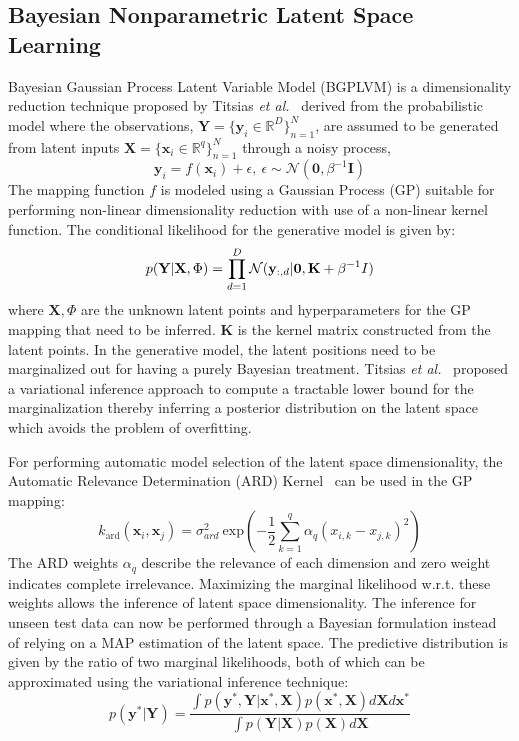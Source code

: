 \documentclass{article}
\begin{document}
\subsection{Bayesian Nonparametric Latent Space Learning}
\label{section:bgplvm}

Bayesian Gaussian Process Latent Variable Model (BGPLVM) is a dimensionality reduction technique proposed by Titsias \emph{et al.}~\cite{bgplvm}  derived from the probabilistic model where the observations, $\mathbf{Y} = \{\mathbf{y}_{i} \in \mathbb{R}^D\}_{n=1}^N$, are assumed to be generated from latent inputs $\mathbf{X} = \{\mathbf{x}_{i} \in \mathbb{R}^q\}_{n=1}^N$ through a noisy process,
\begin{equation}
  \mathbf{y}_i = f(\mathbf{x}_i) + \epsilon,~\epsilon \sim \mathcal{N}(\mathbf{0},\beta^{-1}\mathbf{I})
\end{equation}
The mapping function $f$ is modeled using a Gaussian Process (GP) suitable for performing non-linear dimensionality reduction with use of a non-linear kernel function. The conditional likelihood for the generative model is given by:
\begin{equation}
  \label{eqn:conditionallikelihood}
  p(\mathbf{Y}|\mathbf{X},\Phi) = \prod_{d=1}^{D} \mathcal{N}(\mathbf{y}_{:,d}|\mathbf{0},\mathbf{K}+\beta^{-1}I)\\
\end{equation}
where $\mathbf{X},\Phi$ are the unknown latent points and hyperparameters for the GP mapping that need to be inferred. $\mathbf{K}$ is the kernel matrix constructed from the latent points. In the generative model, the latent positions need to be marginalized out for having a purely Bayesian treatment. Titsias \emph{et al.}~\cite{bgplvm} proposed a variational inference approach to compute a tractable lower bound for the marginalization thereby inferring a posterior distribution on the latent space which avoids the problem of overfitting.

For performing automatic model selection of the latent space dimensionality, the Automatic Relevance Determination (ARD) Kernel~\cite{gp} can be used in the GP mapping:
\begin{equation}
  \label{eqn:ardkernel}
  k_{\text{ard}}(\mathbf{x}_i,\mathbf{x}_j) = \sigma_{ard}^2~\text{exp}\left( - \frac{1}{2} \sum_{k=1}^q{\alpha_q (x_{i,k} - x_{j,k})^2}\right)
\end{equation}
The ARD weights $\alpha_q$ describe the relevance of each dimension and zero weight indicates complete irrelevance. Maximizing the marginal likelihood w.r.t. these weights allows the inference of latent space dimensionality. The inference for unseen test data can now be performed through a Bayesian formulation instead of relying on a MAP estimation of the latent space. The predictive distribution is given by the ratio of two marginal likelihoods, both of which can be approximated using the variational inference technique:
\begin{equation}
	\label{eqn:testinference}
	p(\mathbf{y}^*|\mathbf{Y}) = \frac{\int p(\mathbf{y}^*,\mathbf{Y}|\mathbf{x}^*,\mathbf{X})p(\mathbf{x}^*,\mathbf{X})d\mathbf{X}d\mathbf{x}^*}{\int p(\mathbf{Y}|\mathbf{X})p(\mathbf{X})d\mathbf{X}}
\end{equation}
\end{document}
